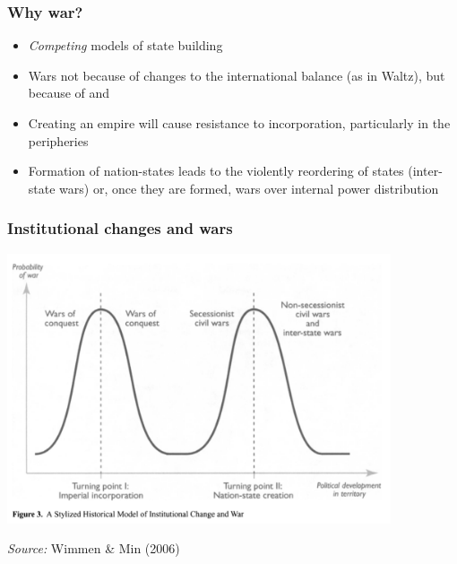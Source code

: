 \documentclass[aspectratio=43, handout]{beamer}
\begin{document}
\begin{frame}
\frametitle{Why war?}
\centering

\begin{itemize}
  \item \textit{Competing} models of state building
  \item Wars not because of changes to the international balance (as in Waltz), but because of  and 
  \item Creating an empire will cause resistance to incorporation, particularly in the peripheries
  \item Formation of nation-states leads to the violently reordering of states (inter-state wars) or, once they are formed, wars over internal power distribution
\end{itemize}

\end{frame}


\begin{frame}
\frametitle{Institutional changes and wars}
\centering

\includegraphics[width = 0.85\textwidth]{img/wimmer_min_fig3}

{\scriptsize \textit{Source:} Wimmen \& Min (2006)}

\end{frame}
\end{document}
